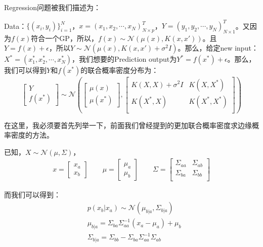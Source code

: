 \documentclass[a4paper]{article}
\begin{document}
Regression问题被我们描述为：

Data：$\{ (x_i,y_i) \}_{i=1}^N$，$x=(x_1,x_2,\cdots,x_N)^T_{N\times p}$，$Y=(y_1,y_2,\cdots,y_N)^T_{N\times 1}$。又因为$f(x)$符合一个GP，所以，$f(x) \sim \mathcal{N}(\mu(x),K(x,x'))$。且$Y=f(x)+\epsilon$，所以$Y\sim \mathcal{N}(\mu(x),K(x,x')+\sigma^2I)$。那么，给定new input：$X^\ast = (x_1^\ast,x_2^\ast,\cdots,x_N^\ast)$，我们想要的Prediction output为$Y^\ast = f(x^\ast) + \epsilon$。那么，我们可以得到$Y$和$f(x^\ast)$的联合概率密度分布为：
\begin{equation}
    \begin{bmatrix}
        Y \\
        f(x^\ast)
    \end{bmatrix}
\sim
\mathcal{N}\left(
    \begin{bmatrix}
        \mu(x) \\
        \mu(x^\ast)
    \end{bmatrix}
    ,
    \begin{bmatrix}
        K(X,X)+\sigma^2I & K(X,X^\ast) \\
        K(X^\ast,X) & K(X^\ast,X^\ast) \\
    \end{bmatrix}
\right)
\end{equation}

在这里，我必须要首先列举一下，前面我们曾经提到的更加联合概率密度求边缘概率密度的方法。

已知，$X\sim \mathcal{N}(\mu,\Sigma)$，
\begin{equation}
    \begin{split}
        x = 
        \begin{bmatrix}
            x_a \\
            x_b
        \end{bmatrix}
        \qquad
        \mu = 
        \begin{bmatrix}
            \mu_a \\
            \mu_b
        \end{bmatrix}
        \qquad
        \Sigma = 
        \begin{bmatrix}
            \Sigma_{aa} & \Sigma_{ab}\\
            \Sigma_{ba} & \Sigma_{bb}\\
        \end{bmatrix}
    \end{split}
\end{equation}

而我们可以得到：
\begin{equation}
    \begin{split}
        & p(x_b|x_a)\sim \mathcal{N}(\mu_{b|a},\Sigma_{b|a}) \\
        & \mu_{b|a} = \Sigma_{ba}\Sigma_{aa}^{-1}(x_a - \mu_a)+\mu_b \\
        & \Sigma_{b|a} = \Sigma_{bb} - \Sigma_{ba}\Sigma_{aa}^{-1}\Sigma_{ab} \\
    \end{split}
\end{equation}
\end{document}
